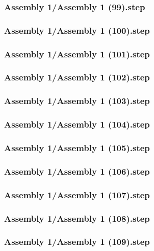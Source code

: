 \documentclass[a4paper,12pt]{article}
\begin{document}
\subsubsection{Assembly 1/Assembly 1 (99).step}

\subsubsection{Assembly 1/Assembly 1 (100).step}

\subsubsection{Assembly 1/Assembly 1 (101).step}

\subsubsection{Assembly 1/Assembly 1 (102).step}

\subsubsection{Assembly 1/Assembly 1 (103).step}

\subsubsection{Assembly 1/Assembly 1 (104).step}

\subsubsection{Assembly 1/Assembly 1 (105).step}

\subsubsection{Assembly 1/Assembly 1 (106).step}

\subsubsection{Assembly 1/Assembly 1 (107).step}

\subsubsection{Assembly 1/Assembly 1 (108).step}

\subsubsection{Assembly 1/Assembly 1 (109).step}

\end{document}
